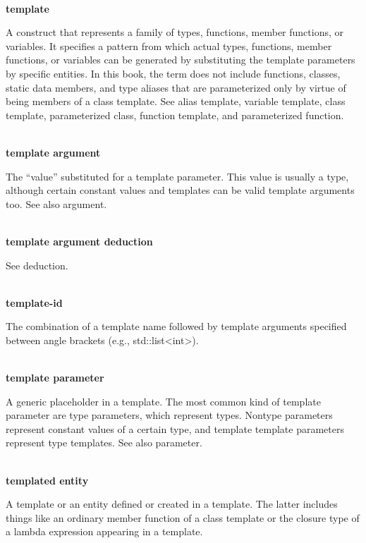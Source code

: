 \hspace*{\fill} \\ %
\noindent
\textbf{template}

A construct that represents a family of types, functions, member functions, or variables. It specifies a pattern from which actual types, functions, member functions, or variables can be generated by substituting the template parameters by specific entities. In this book, the term does not include functions, classes, static data members, and type aliases that are parameterized only by virtue of being members of a class template. See alias template, variable template, class template, parameterized class, function template, and parameterized function.

\hspace*{\fill} \\ %
\noindent
\textbf{template argument}

The “value” substituted for a template parameter. This value is usually a type, although certain constant values and templates can be valid template arguments too. See also argument.

\hspace*{\fill} \\ %
\noindent
\textbf{template argument deduction}

See deduction.

\hspace*{\fill} \\ %
\noindent
\textbf{template-id}

The combination of a template name followed by template arguments specified between angle brackets (e.g., std::list<int>).

\hspace*{\fill} \\ %
\noindent
\textbf{template parameter}

A generic placeholder in a template. The most common kind of template parameter are type parameters, which represent types. Nontype parameters represent constant values of a certain type, and template template parameters represent type templates. See also parameter.

\hspace*{\fill} \\ %
\noindent
\textbf{templated entity}

A template or an entity defined or created in a template. The latter includes things like an ordinary member function of a class template or the closure type of a lambda expression appearing in a template.

